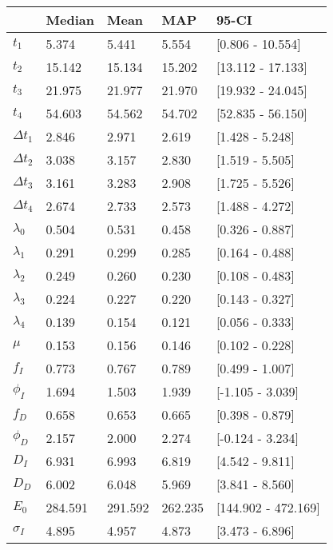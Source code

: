 \begin{tabular}{lllll}
\toprule
{} &   Median &     Mean &      MAP &                95-CI \\
\midrule
$t_1$        &    5.374 &    5.441 &    5.554 &     [0.806 - 10.554] \\
$t_2$        &   15.142 &   15.134 &   15.202 &    [13.112 - 17.133] \\
$t_3$        &   21.975 &   21.977 &   21.970 &    [19.932 - 24.045] \\
$t_4$        &   54.603 &   54.562 &   54.702 &    [52.835 - 56.150] \\
$\Delta t_1$ &    2.846 &    2.971 &    2.619 &      [1.428 - 5.248] \\
$\Delta t_2$ &    3.038 &    3.157 &    2.830 &      [1.519 - 5.505] \\
$\Delta t_3$ &    3.161 &    3.283 &    2.908 &      [1.725 - 5.526] \\
$\Delta t_4$ &    2.674 &    2.733 &    2.573 &      [1.488 - 4.272] \\
$\lambda_0$  &    0.504 &    0.531 &    0.458 &      [0.326 - 0.887] \\
$\lambda_1$  &    0.291 &    0.299 &    0.285 &      [0.164 - 0.488] \\
$\lambda_2$  &    0.249 &    0.260 &    0.230 &      [0.108 - 0.483] \\
$\lambda_3$  &    0.224 &    0.227 &    0.220 &      [0.143 - 0.327] \\
$\lambda_4$  &    0.139 &    0.154 &    0.121 &      [0.056 - 0.333] \\
$\mu$        &    0.153 &    0.156 &    0.146 &      [0.102 - 0.228] \\
$f_I$        &    0.773 &    0.767 &    0.789 &      [0.499 - 1.007] \\
$\phi_I$     &    1.694 &    1.503 &    1.939 &     [-1.105 - 3.039] \\
$f_D$        &    0.658 &    0.653 &    0.665 &      [0.398 - 0.879] \\
$\phi_D$     &    2.157 &    2.000 &    2.274 &     [-0.124 - 3.234] \\
$D_I$        &    6.931 &    6.993 &    6.819 &      [4.542 - 9.811] \\
$D_D$        &    6.002 &    6.048 &    5.969 &      [3.841 - 8.560] \\
$E_0$        &  284.591 &  291.592 &  262.235 &  [144.902 - 472.169] \\
$\sigma_I$   &    4.895 &    4.957 &    4.873 &      [3.473 - 6.896] \\

\end{tabular}

